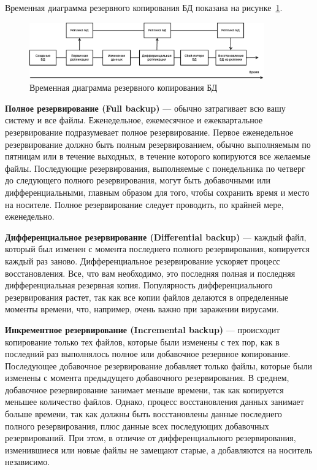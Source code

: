 \documentclass[russian,utf8,emptystyle]{eskdtext}
\begin{document}
Временная диаграмма резервного копирования БД показана на рисунке~\ref{fig:replica-1}.

\begin{figure}[h!]
\centering
\includegraphics[width=0.9\textwidth]{replication}
\caption{Временная диаграмма резервного копирования БД}
\label{fig:replica-1}
\end{figure}

\textbf{Полное резервирование (Full backup)} — обычно затрагивает всю вашу систему и все файлы. Еженедельное, ежемесячное и ежеквартальное резервирование подразумевает полное резервирование. Первое еженедельное резервирование должно быть полным резервированием, обычно выполняемым по пятницам или в течение выходных, в течение которого копируются все желаемые файлы. Последующие резервирования, выполняемые с понедельника по четверг до следующего полного резервирования, могут быть добавочными или дифференциальными, главным образом для того, чтобы сохранить время и место на носителе. Полное резервирование следует проводить, по крайней мере, еженедельно.

\textbf{Дифференциальное резервирование (Differential backup)} — каждый файл, который был изменен с момента последнего полного резервирования, копируется каждый раз заново. Дифференциальное резервирование ускоряет процесс восстановления. Все, что вам необходимо, это последняя полная и последняя дифференциальная резервная копия. Популярность дифференциального резервирования растет, так как все копии файлов делаются в определенные моменты времени, что, например, очень важно при заражении вирусами.

\textbf{Инкрементное резервирование (Incremental backup)} — происходит копирование только тех файлов, которые были изменены с тех пор, как в последний раз выполнялось полное или добавочное резервное копирование. Последующее добавочное резервирование добавляет только файлы, которые были изменены с момента предыдущего добавочного резервирования. В среднем, добавочное резервирование занимает меньше времени, так как копируется меньшее количество файлов. Однако, процесс восстановления данных занимает больше времени, так как должны быть восстановлены данные последнего полного резервирования, плюс данные всех последующих добавочных резервирований. При этом, в отличие от дифференциального резервирования, изменившиеся или новые файлы не замещают старые, а добавляются на носитель независимо.
\end{document}
